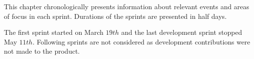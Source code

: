 This chapter chronologically presents information about relevant events and areas of focus in each sprint. 
Durations of the sprints are presented in half days. 

The first sprint started on March $19th$ and the last development sprint stopped May $11th$.
Following sprints are not considered as development contributions were not made to the product.